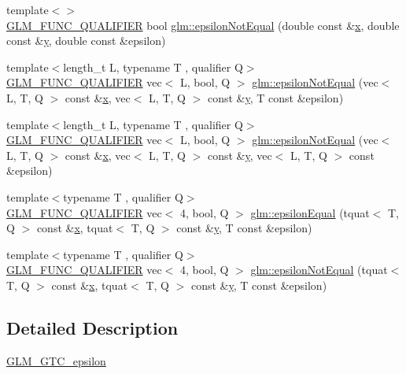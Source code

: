 \begin{DoxyCompactItemize}
\item 
{\footnotesize template$<$$>$ }\\\hyperlink{setup_8hpp_a33fdea6f91c5f834105f7415e2a64407}{G\+L\+M\+\_\+\+F\+U\+N\+C\+\_\+\+Q\+U\+A\+L\+I\+F\+I\+ER} bool \hyperlink{namespaceglm_a68d8ce38812c8599018e404afc79f088}{glm\+::epsilon\+Not\+Equal} (double const \&\hyperlink{_s_d_l__opengl_8h_ad0e63d0edcdbd3d79554076bf309fd47}{x}, double const \&\hyperlink{_s_d_l__opengl_8h_a1675d9d7bb68e1657ff028643b4037e3}{y}, double const \&epsilon)
\item 
{\footnotesize template$<$length\+\_\+t L, typename T , qualifier Q$>$ }\\\hyperlink{setup_8hpp_a33fdea6f91c5f834105f7415e2a64407}{G\+L\+M\+\_\+\+F\+U\+N\+C\+\_\+\+Q\+U\+A\+L\+I\+F\+I\+ER} vec$<$ L, bool, Q $>$ \hyperlink{group__gtc__epsilon_gaf840d33b9a5261ec78dcd5125743b025}{glm\+::epsilon\+Not\+Equal} (vec$<$ L, T, Q $>$ const \&\hyperlink{_s_d_l__opengl_8h_ad0e63d0edcdbd3d79554076bf309fd47}{x}, vec$<$ L, T, Q $>$ const \&\hyperlink{_s_d_l__opengl_8h_a1675d9d7bb68e1657ff028643b4037e3}{y}, T const \&epsilon)
\item 
{\footnotesize template$<$length\+\_\+t L, typename T , qualifier Q$>$ }\\\hyperlink{setup_8hpp_a33fdea6f91c5f834105f7415e2a64407}{G\+L\+M\+\_\+\+F\+U\+N\+C\+\_\+\+Q\+U\+A\+L\+I\+F\+I\+ER} vec$<$ L, bool, Q $>$ \hyperlink{namespaceglm_a74221cd9d4ae4bf14a94b9fd781e4d78}{glm\+::epsilon\+Not\+Equal} (vec$<$ L, T, Q $>$ const \&\hyperlink{_s_d_l__opengl_8h_ad0e63d0edcdbd3d79554076bf309fd47}{x}, vec$<$ L, T, Q $>$ const \&\hyperlink{_s_d_l__opengl_8h_a1675d9d7bb68e1657ff028643b4037e3}{y}, vec$<$ L, T, Q $>$ const \&epsilon)
\item 
{\footnotesize template$<$typename T , qualifier Q$>$ }\\\hyperlink{setup_8hpp_a33fdea6f91c5f834105f7415e2a64407}{G\+L\+M\+\_\+\+F\+U\+N\+C\+\_\+\+Q\+U\+A\+L\+I\+F\+I\+ER} vec$<$ 4, bool, Q $>$ \hyperlink{namespaceglm_aace7d888eddc231974f670d0f5c11873}{glm\+::epsilon\+Equal} (tquat$<$ T, Q $>$ const \&\hyperlink{_s_d_l__opengl_8h_ad0e63d0edcdbd3d79554076bf309fd47}{x}, tquat$<$ T, Q $>$ const \&\hyperlink{_s_d_l__opengl_8h_a1675d9d7bb68e1657ff028643b4037e3}{y}, T const \&epsilon)
\item 
{\footnotesize template$<$typename T , qualifier Q$>$ }\\\hyperlink{setup_8hpp_a33fdea6f91c5f834105f7415e2a64407}{G\+L\+M\+\_\+\+F\+U\+N\+C\+\_\+\+Q\+U\+A\+L\+I\+F\+I\+ER} vec$<$ 4, bool, Q $>$ \hyperlink{namespaceglm_a0feea019d5228d3fdab3b21a7cd32dcd}{glm\+::epsilon\+Not\+Equal} (tquat$<$ T, Q $>$ const \&\hyperlink{_s_d_l__opengl_8h_ad0e63d0edcdbd3d79554076bf309fd47}{x}, tquat$<$ T, Q $>$ const \&\hyperlink{_s_d_l__opengl_8h_a1675d9d7bb68e1657ff028643b4037e3}{y}, T const \&epsilon)
\end{DoxyCompactItemize}


\subsection{Detailed Description}
\hyperlink{group__gtc__epsilon}{G\+L\+M\+\_\+\+G\+T\+C\+\_\+epsilon} 